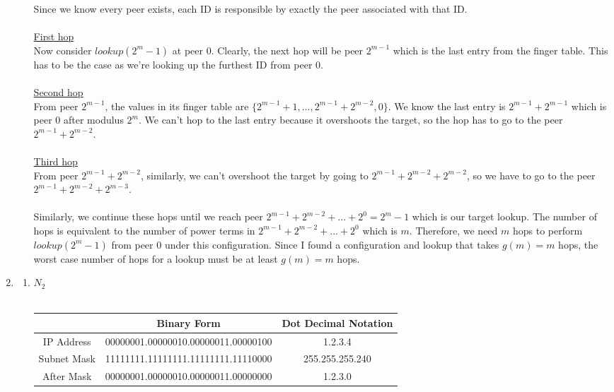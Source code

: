 \documentclass[12pt]{article}
\begin{document}
\begin{enumerate}
\begin{enumerate}
	Since we know every peer exists, each ID is responsible by exactly the peer associated with that ID. \\ \\
	\underline{First hop}	\\
	Now consider $lookup(2^m - 1)$ at peer $0$. Clearly, the next hop will be peer $2^{m-1}$ which is the last entry from the finger table. This has to be the case as we're looking up the furthest ID from peer 0.  \\ \\
	\underline{Second hop} \\
	From peer $2^{m-1}$, the values in its finger table are $\{2^{m-1} + 1, ... , 2^{m-1} + 2^{m-2}, 0\}$. We know the last entry is $2^{m-1} + 2^{m-1}$ which is peer 0 after modulus $2^m$. We can't hop to the last entry because it overshoots the target, so the hop has to go to the peer $2^{m-1} + 2^{m-2}$. \\ \\
	\underline{Third hop} \\
	From peer $2^{m-1} + 2^{m-2}$, similarly, we can't overshoot the target by going to $2^{m-1} + 2^{m-2} + 2^{m-2}$, so we have to go to the peer $2^{m-1} + 2^{m-2} + 2^{m-3}$. \\ \\
	Similarly, we continue these hops until we reach peer $2^{m-1} + 2^{m-2} + ... + 2^{0} = 2^m - 1$ which is our target lookup. The number of hops is equivalent to the number of power terms in $2^{m-1} + 2^{m-2} + ... + 2^{0}$ which is $m$. Therefore, we need $m$ hops to perform $lookup(2^m - 1)$ from peer 0 under this configuration. Since I found a configuration and lookup that takes $g(m) = m$ hops, the worst case number of hops for a lookup must be at least $g(m) = m$ hops.
	
    \end{enumerate}

    \item 
    \begin{enumerate}
        \item  \underline{$N_2$} \\ \\
        \begin{tabular}{ |c|c|c| } 
         \hline
         & Binary Form & Dot Decimal Notation \\ 
         \hline
         IP Address & 00000001.00000010.00000011.00000100 & 1.2.3.4 \\ 
         Subnet Mask & 11111111.11111111.11111111.11110000 & 255.255.255.240 \\
         After Mask & 00000001.00000010.00000011.00000000 & 1.2.3.0 \\
         \hline
        \end{tabular}
        

\end{enumerate}
\end{enumerate}
\end{document}
